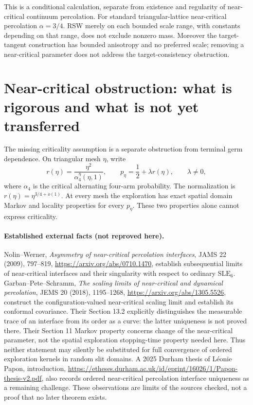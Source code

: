 \documentclass[11pt]{article}
\theoremstyle{definition}\newtheorem{definition}[theorem]{Definition}
\theoremstyle{remark}\newtheorem{remark}[theorem]{Remark}
\begin{document}
This is a conditional calculation, separate from existence and regularity
of near-critical continuum percolation. For standard triangular-lattice
near-critical percolation $\alpha=3/4$.
RSW merely on each bounded scale range, with constants depending on that
range, does not exclude nonzero mass. Moreover the target-tangent
construction has bounded anisotropy and no preferred scale; removing a
near-critical parameter does not address the target-consistency obstruction.

\section{Near-critical obstruction: what is rigorous and what is not yet transferred}
\label{sec:nearcritical-caveat}

The missing criticality assumption is a separate obstruction from terminal
germ dependence.  On triangular mesh $\eta$, write
\[
 r(\eta)=\frac{\eta^2}{\alpha_4^{\eta}(\eta,1)},\qquad
 p_\eta=\frac12+\lambda r(\eta),\qquad \lambda\ne0,
\]
where $\alpha_4$ is the critical alternating four-arm probability.  The
normalization is $r(\eta)=\eta^{3/4+o(1)}$.  At every mesh the exploration has
exact spatial domain Markov and locality properties for every $p_\eta$.
These two properties alone cannot express criticality.

\paragraph{Established external facts (not reproved here).}
Nolin--Werner, \emph{Asymmetry of near-critical percolation interfaces},
JAMS 22 (2009), 797--819,
\url{https://arxiv.org/abs/0710.1470}, establish subsequential limits of
near-critical interfaces and their singularity with respect to ordinary
$\mathrm{SLE}_6$.  Garban--Pete--Schramm, \emph{The scaling limits of
near-critical and dynamical percolation}, JEMS 20 (2018), 1195--1268,
\url{https://arxiv.org/abs/1305.5526}, construct the configuration-valued
near-critical scaling limit and establish its conformal covariance.  Their
Section 13.2 explicitly distinguishes the measurable trace of an interface
from its order as a curve: the latter uniqueness is not proved there.
Their Section 11 Markov property concerns change of the near-critical
parameter, not the spatial exploration stopping-time property needed here.
Thus neither statement may silently be substituted for full convergence of
ordered exploration kernels in random slit domains.  A 2025 Durham thesis
of L\'eonie Papon, introduction,
\url{https://etheses.durham.ac.uk/id/eprint/16026/1/Papon-thesis-v2.pdf},
also records ordered near-critical percolation interface uniqueness as a
remaining challenge.  These observations are limits of the sources checked,
not a proof that no later theorem exists.
\end{document}
